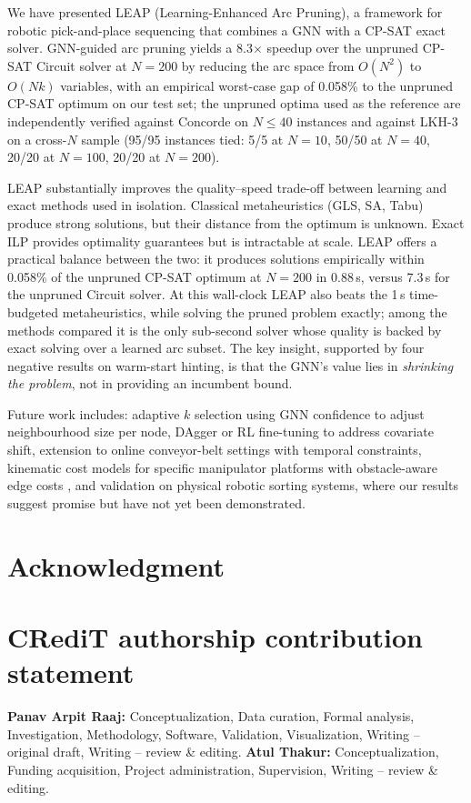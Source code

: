 \documentclass[review,times]{elsarticle}
\begin{document}
We have presented LEAP (Learning-Enhanced Arc Pruning), a framework for robotic pick-and-place sequencing that combines a GNN with a CP-SAT exact solver. GNN-guided arc pruning yields a 8.3$\times$ speedup over the unpruned CP-SAT Circuit solver at $N{=}200$ by reducing the arc space from $O(N^2)$ to $O(Nk)$ variables, with an empirical worst-case gap of 0.058\% to the unpruned CP-SAT optimum on our test set; the unpruned optima used as the reference are independently verified against Concorde \cite{applegate2006concorde} on $N\!\le\!40$ instances and against LKH-3 \cite{helsgaun2000lkh} on a cross-$N$ sample (95/95 instances tied: 5/5 at $N{=}10$, 50/50 at $N{=}40$, 20/20 at $N{=}100$, 20/20 at $N{=}200$).

LEAP substantially improves the quality--speed trade-off between learning and exact methods used in isolation. Classical metaheuristics (GLS, SA, Tabu) produce strong solutions, but their distance from the optimum is unknown. Exact ILP provides optimality guarantees but is intractable at scale. LEAP offers a practical balance between the two: it produces solutions empirically within 0.058\% of the unpruned CP-SAT optimum at $N{=}200$ in 0.88\,s, versus 7.3\,s for the unpruned Circuit solver. At this wall-clock LEAP also beats the 1\,s time-budgeted metaheuristics, while solving the pruned problem exactly; among the methods compared it is the only sub-second solver whose quality is backed by exact solving over a learned arc subset. The key insight, supported by four negative results on warm-start hinting, is that the GNN's value lies in \emph{shrinking the problem}, not in providing an incumbent bound.

Future work includes: adaptive $k$ selection using GNN confidence to adjust neighbourhood size per node, DAgger \cite{ross2011dagger} or RL fine-tuning to address covariate shift, extension to online conveyor-belt settings with temporal constraints, kinematic cost models for specific manipulator platforms \cite{han2020pap} with obstacle-aware edge costs \cite{ojha2025obstacle}, and validation on physical robotic sorting systems, where our results suggest promise but have not yet been demonstrated.

\section*{Acknowledgment}

\section*{CRediT authorship contribution statement}
\textbf{Panav Arpit Raaj:} Conceptualization, Data curation, Formal analysis, Investigation, Methodology, Software, Validation, Visualization, Writing -- original draft, Writing -- review \& editing.
\textbf{Atul Thakur:} Conceptualization, Funding acquisition, Project administration, Supervision, Writing -- review \& editing.
\end{document}
